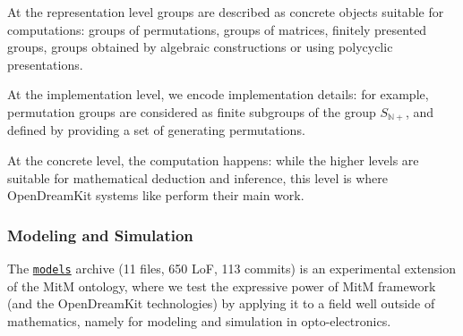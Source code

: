 At the representation level groups are described as concrete objects
suitable for computations: groups of permutations, groups of matrices,
finitely presented groups, groups obtained by algebraic constructions or using
polycyclic presentations.

At the implementation level, we encode implementation details: for
example, permutation groups are considered as finite subgroups of the group $S_{\mathbb{N}+}$, and defined  by
providing a set of generating permutations.

At the concrete level, the computation happens: while the higher levels
are suitable for mathematical deduction and inference, this level is where OpenDreamKit systems like \GAP perform their main work.

\subsubsection{Modeling and Simulation}

The \href{https://gl.mathhub.info/MitM/smglom}{\texttt{models}}
archive (11 files, 650 LoF, 113 commits) is an experimental extension
of the MitM ontology, where we test the expressive power of MitM
framework (and the OpenDreamKit technologies) by applying it to a
field well outside of mathematics, namely for modeling and simulation
in opto-electronics.


